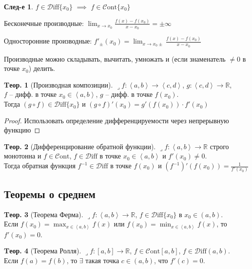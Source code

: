\documentclass[a4paper,12pt]{article}
\numberwithin{figure}{section}
\theoremstyle{definition}
\newtheorem{theorem}{Tеор.}[section]
\newtheorem*{corollary}{След-е} %
\def\DS{\displaystyle}
\def\R{\mathbb{R}}
\def\Cont{\!\in\!\mathcal{C}\mathrm{ont}}
\def\Diff{\!\in\!\mathcal{D}\mathrm{iff}}
\def\on{\!:}
\def\intab{\left<a,b\right>}
\def\circlethree{\ding{194}\space}
\def\lets{{\huge$\lrcorner$}\space}
\begin{document}
\begin{corollary}
	$f\Diff\{x_0\}$ $\implies$ $f\Cont\{x_0\}$
\end{corollary}


Бесконечные производные:
$\DS \lim_{x\to x_0}\frac{f(x)-f(x_0)}{x-x_0} = \pm\infty$

Односторонние производные:
$\DS f'_{\pm}(x_0) = \lim_{x\to x_0\pm}\frac{f(x)-f(x_0)}{x-x_0}$

Производные можно складывать, вычитать, умножать
и (если знаменатель $\ne0$ в точке $x_0$) делить.


\begin{theorem}[Производная композиции]
	\def\intcd{\left<c,d\right>}
	\lets $f\on \intab \to \intcd$,	\medspace $g\on \intcd \to \R$,
	\\ $f$ -- дифф. в точке $x_0 \in\intab$, \medspace $g$ -- дифф. в точке $f(x_0)$.
	\\ Тогда $(g \circ f)\Diff\{x_0\}$ и $(g \circ f)'(x_0) = g'(f(x_0)) \cdot f'(x_0)$
\end{theorem}
\begin{proof}
	Использовать определение дифференцируемости
	\circlethree через непрерывную функцию
\end{proof}


\begin{theorem}[Дифференцирование обратной функции]
	\lets $f\on\intab\to\R$ строго монотонна и $f\Cont$,
	$f\Diff$ в точке $x_0 \in\intab$ и $f'(x_0) \ne 0$. \\
	Тогда обратная функция $f^{-1}\Diff$ в точке $f(x_0)$ и
	$\DS \left(f^{-1}\right)'\left(f(x_0)\right) = \frac1{f'(x_0)}$
\end{theorem}


\subsection{Теоремы о среднем}

\begin{theorem}[Теорема Ферма]
	\lets $f\on\intab\to\R$, $f\Diff\{x_0\}$ в $x_0\in(a,b)$. \\
	Если $\DS f(x_0)=\max_{x\in\intab}f(x)$ или $\DS f(x_0)=\min_{x\in\intab}f(x)$,
	то $f'(x_0)=0$.
\end{theorem}

\begin{theorem}[Теорема Ролля]
	\lets $f\on[a,b]\to\R$, $f\Cont[a,b]$, $f\Diff(a,b)$. \\
	Если $f(a)=f(b)$, то $\exists$ такая точка $c\in(a,b)$, что $f'(c)=0$.
\end{theorem}
\end{document}
